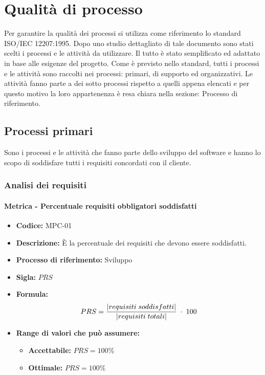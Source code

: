 \section{Qualità di processo}
Per garantire la qualità dei processi si utilizza come riferimento lo standard ISO/IEC 12207:1995. Dopo uno studio dettagliato di tale documento sono stati scelti i processi
e le attività da utilizzare. Il tutto è stato semplificato ed adattato in base alle esigenze del progetto. Come è previsto nello standard, tutti i processi e le attività sono raccolti 
nei processi: primari, di supporto ed organizzativi. Le attività fanno parte a dei sotto processi rispetto a quelli appena elencati e per questo motivo la loro 
appartenenza è resa chiara nella sezione: Processo di riferimento.

\subsection{Processi primari}
Sono i processi e le attività che fanno parte dello sviluppo del software e hanno lo scopo di soddisfare tutti i requisiti concordati con il cliente.

\subsubsection{Analisi dei requisiti}
    \paragraph{Metrica - Percentuale requisiti obbligatori soddisfatti}
    \begin{itemize}
        \item \textbf{Codice:} MPC-01
        \item \textbf{Descrizione:} È la percentuale dei requisiti che devono essere soddisfatti.
        \item \textbf{Processo di riferimento:} Sviluppo
        \item \textbf{Sigla:} $PRS$
        \item \textbf{Formula:} $$PRS = {|requisiti \; soddisfatti| \over |requisiti \; totali|}\; \cdot \; 100$$
        \item \textbf{Range di valori che può assumere:}
        \begin{itemize}
            \item \textbf{Accettabile:} $PRS = 100\%$
            \item \textbf{Ottimale:} $PRS = 100\%$
        \end{itemize}
    \end{itemize} 
